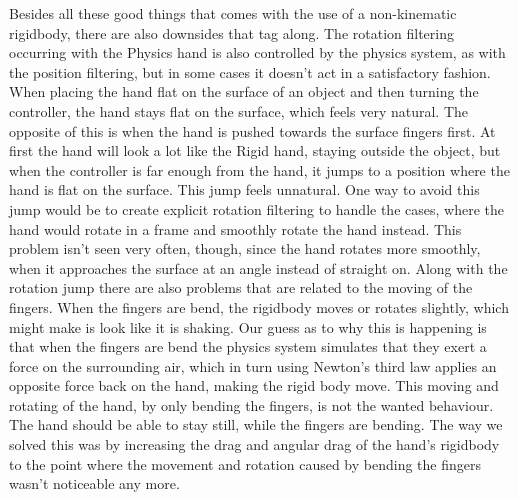 Besides all these good things that comes with the use of a non-kinematic rigidbody, there are also downsides that tag along. The rotation filtering occurring with the Physics hand is also controlled by the physics system, as with the position filtering, but in some cases it doesn't act in a satisfactory fashion. When placing the hand flat on the surface of an object and then turning the controller, the hand stays flat on the surface, which feels very natural. The opposite of this is when the hand is pushed towards the surface fingers first. At first the hand will look a lot like the Rigid hand, staying outside the object, but when the controller is far enough from the hand, it jumps to a position where the hand is flat on the surface. This jump feels unnatural. One way to avoid this jump would be to create explicit rotation filtering to handle the cases, where the hand would rotate in a frame and smoothly rotate the hand instead. This problem isn't seen very often, though, since the hand rotates more smoothly, when it approaches the surface at an angle instead of straight on. Along with the rotation jump there are also problems that are related to the moving of the fingers. When the fingers are bend, the rigidbody moves or rotates slightly, which might make is look like it is shaking. Our guess as to why this is happening is that when the fingers are bend the physics system simulates that they exert a force on the surrounding air, which in turn using Newton's third law applies an opposite force back on the hand, making the rigid body move. This moving and rotating of the hand, by only bending the fingers, is not the wanted behaviour. The hand should be able to stay still, while the fingers are bending. The way we solved this was by increasing the drag and angular drag of the hand's rigidbody to the point where the movement and rotation caused by bending the fingers wasn't noticeable any more.


